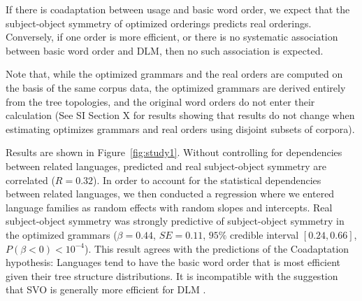 \documentclass[11pt,a4paper]{article}
\newcommand\comment[1]{{\color{red}#1}}
\begin{document}
If there is coadaptation between usage and basic word order, we expect that the subject-object symmetry of optimized orderings predicts real orderings.
Conversely, if one order is more efficient, or there is no systematic association between basic word order and DLM, then no such association is expected.


Note that, while the optimized grammars and the real orders are computed on the basis of the same corpus data, the optimized grammars are derived entirely from the tree topologies, and the original word orders do not enter their calculation (See SI Section X for results showing that results do not change when estimating optimizes grammars and real orders using disjoint subsets of corpora).




Results are shown in Figure~\ref{fig:study1}.
Without controlling for dependencies between related languages, predicted and real subject-object symmetry are correlated ($R=0.32$).
In order to account for the statistical dependencies between related languages, we then conducted a regression where we entered language families as random effects with random slopes and intercepts.
Real subject-object symmetry was strongly predictive of subject-object symmetry in the optimized grammars ($\beta = 0.44$, $SE=0.11$, $95\%$ credible interval $[0.24, 0.66]$, $P(\beta<0) < 10^{-4}$).
This result agrees with the predictions of the Coadaptation hypothesis: Languages tend to have the basic word order that is most efficient given their tree structure distributions.
It is incompatible with the suggestion that SVO is generally more efficient for DLM \citep{ferrer-i-cancho-placement-2017}.



\end{document}
